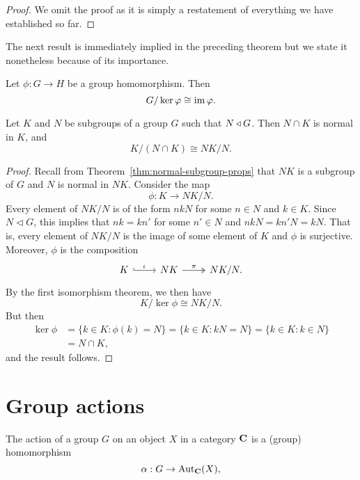 \begin{proof}
    We omit the proof as it is simply a restatement of everything we have
    established so far.
\end{proof}

The next result is immediately implied in the preceding theorem but we state it
nonetheless because of its importance.

\begin{theorem}
    Let \(\phi: G \to H\) be a group homomorphism. Then
    \[
        G/\ker \varphi \cong \operatorname{im} \varphi.
    \]
\end{theorem}

\begin{theorem}
    Let \(K\) and \(N\) be subgroups of a group \(G\) such that
    \(N \triangleleft G\). Then \(N \cap K\) is normal in \(K\), and
    \[
        K/(N \cap K) \cong NK/N.
    \]
\end{theorem}

\begin{proof}
    Recall from Theorem~\ref{thm:normal-subgroup-props} that \(NK\) is a
    subgroup of \(G\) and \(N\) is normal in \(NK\). Consider the map
    \[
        \phi : K \to NK/N.
    \]
    Every element of \(NK/N\) is of the form \(nkN\) for some \(n \in N\) and
    \(k \in K\). Since \(N \triangleleft G\), this implies that \(nk = kn'\) for
    some \(n' \in N\) and \(nkN = kn'N = kN\). That is, every element of
    \(NK/N\) is the image of some element of \(K\) and \(\phi\) is surjective.
    Moreover, \(\phi\) is the composition
    \[
        \begin{tikzcd}
            K \arrow[r, "\iota", hook] & NK \arrow[r, "\pi", two heads] & NK/N.
            \end{tikzcd}
    \]
    By the first isomorphism theorem, we then have
    \[
        K/\ker \phi \cong NK/N.
    \]
    But then
    \begin{align*}
        \ker \phi &= \{k \in K : \phi(k) = N\} = \{k \in K : kN = N\} = \{k \in K : k \in N\}\\ &= N \cap K,
    \end{align*}
    and the result follows.
\end{proof}

\section{Group actions}

\begin{definition}
    The action of a group \(G\) on an object \(X\) in a category \(\mathbf{C}\) is
    a (group) homomorphism
    \[
        \alpha: G \to \operatorname{Aut}_{\mathbf{C}}(X),
    \]
\end{definition}


